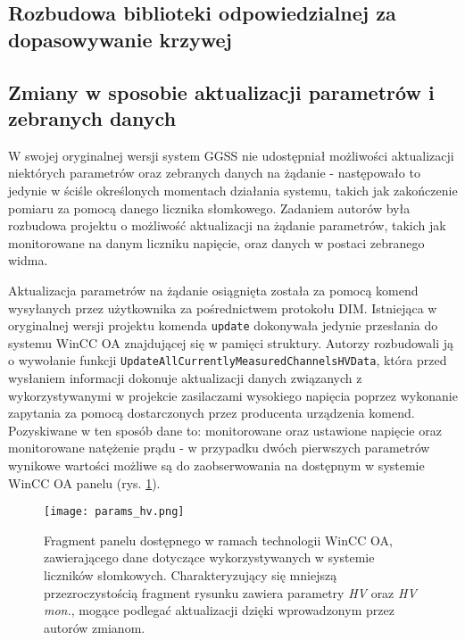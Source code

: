 \clearpage
\subsection{Rozbudowa biblioteki odpowiedzialnej za dopasowywanie krzywej}

\clearpage
\subsection{Zmiany w sposobie aktualizacji parametrów i zebranych danych}
W swojej oryginalnej wersji system GGSS nie udostępniał możliwości aktualizacji niektórych parametrów oraz zebranych danych na żądanie - następowało to jedynie w ściśle określonych momentach działania systemu, takich jak zakończenie pomiaru za pomocą danego licznika słomkowego. Zadaniem autorów była rozbudowa projektu o możliwość aktualizacji na żądanie parametrów, takich jak monitorowane na danym liczniku napięcie, oraz danych w postaci zebranego widma.

Aktualizacja parametrów na żądanie osiągnięta została za pomocą komend wysyłanych przez użytkownika za pośrednictwem protokołu DIM. Istniejąca w oryginalnej wersji projektu komenda \lstinline{update} dokonywała jedynie przesłania do systemu WinCC OA znajdującej się w pamięci struktury. Autorzy rozbudowali ją o wywołanie funkcji \lstinline{UpdateAllCurrentlyMeasuredChannelsHVData}, która przed wysłaniem informacji dokonuje aktualizacji danych związanych z wykorzystywanymi w projekcie zasilaczami wysokiego napięcia poprzez wykonanie zapytania za pomocą dostarczonych przez producenta urządzenia komend. Pozyskiwane w ten sposób dane to: monitorowane oraz ustawione napięcie oraz monitorowane natężenie prądu - w przypadku dwóch pierwszych parametrów wynikowe wartości możliwe są do zaobserwowania na dostępnym w systemie WinCC OA panelu (rys. \ref{fig:hv_params}).

\begin{figure}[H]
\centering
\texttt{[image: params\_hv.png]}
\caption{Fragment panelu dostępnego w ramach technologii WinCC OA, zawierającego dane dotyczące wykorzystywanych w systemie liczników słomkowych. Charakteryzujący się mniejszą przezroczystością fragment rysunku zawiera parametry \emph{HV} oraz \emph{HV mon.}, mogące podlegać aktualizacji dzięki wprowadzonym przez autorów zmianom.}
\label{fig:hv_params}
\end{figure}

